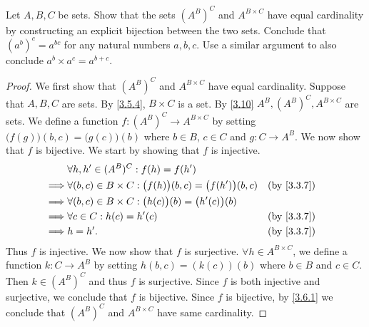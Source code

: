 \begin{ex}\label{ex:3.6.6}
	Let \(A, B, C\) be sets.
	Show that the sets \((A^B)^C\) and \(A^{B \times C}\) have equal cardinality by constructing an explicit bijection between the two sets.
	Conclude that \((a^b)^c = a^{bc}\) for any natural numbers \(a, b, c\).
	Use a similar argument to also conclude \(a^b \times a^c = a^{b+c}\).
\end{ex}

\begin{proof}
	We first show that \((A^B)^C\) and \(A^{B \times C}\) have equal cardinality.
	Suppose that \(A, B, C\) are sets.
	By \cref{3.5.4}, \(B \times C\) is a set.
	By \cref{3.10} \(A^B, (A^B)^C, A^{B \times C}\) are sets.
	We define a function \(f : (A^B)^C \to A^{B \times C}\) by setting \(\big(f(g)\big)(b, c) = \big(g(c)\big)(b)\) where \(b \in B\), \(c \in C\) and \(g : C \to A^B\).
	We now show that \(f\) is bijective.
	We start by showing that \(f\) is injective.
	\begin{align*}
		         & \forall h, h' \in (A^B)^C : f(h) = f(h')                                                     \\
		\implies & \forall (b, c) \in B \times C : \big(f(h)\big)(b, c) = \big(f(h')\big)(b, c) &  & \by{3.3.7} \\
		\implies & \forall (b, c) \in B \times C : \big(h(c)\big)(b) = \big(h'(c)\big)(b)                       \\
		\implies & \forall c \in C : h(c) = h'(c)                                               &  & \by{3.3.7} \\
		\implies & h = h'.                                                                      &  & \by{3.3.7}
	\end{align*}
	Thus \(f\) is injective.
	We now show that \(f\) is surjective.
	\(\forall h \in A^{B \times C}\), we define a function \(k : C \to A^B\) by setting \(h(b, c) = (k(c))(b)\) where \(b \in B\) and \(c \in C\).
	Then \(k \in (A^B)^C\) and thus \(f\) is surjective.
	Since \(f\) is both injective and surjective, we conclude that \(f\) is bijective.
	Since \(f\) is bijective, by \cref{3.6.1} we conclude that \((A^B)^C\) and \(A^{B \times C}\) have same cardinality.


\end{proof}
